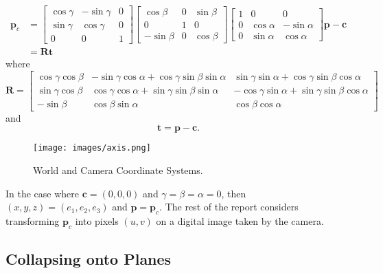 \documentclass[12pt]{article}
\newcommand{\mtx}[1]{\ensuremath{\mathbf{#1}}}
\begin{document}
\begin{align}
\textbf{p}_c & = 
\begin{bmatrix}
    \cos\gamma & -\sin\gamma & 0 \\
    \sin\gamma & \cos\gamma & 0 \\
       0 & 0 & 1
\end{bmatrix}
\begin{bmatrix}
    \cos\beta & 0 & \sin\beta \\
    0 & 1 & 0 \\
   -\sin\beta & 0 & \cos\beta
\end{bmatrix}
\begin{bmatrix}
    1 & 0 & 0 \\
    0 & \cos\alpha & -\sin\alpha \\
    0 & \sin\alpha &  \cos\alpha
\end{bmatrix}
\textbf{p}-\textbf{c}
\\ & =
\mtx{R} \mtx{t}
\end{align}
where
\begin{equation}
\mtx{R} =
\begin{bmatrix}
\cos\gamma\cos\beta & -\sin\gamma\cos\alpha + \cos\gamma\sin\beta\sin\alpha & \sin\gamma\sin\alpha + \cos\gamma\sin\beta\cos\alpha \\
\sin\gamma\cos\beta & \cos\gamma\cos\alpha + \sin\gamma\sin\beta\sin\alpha & -\cos\gamma\sin\alpha + \sin\gamma\sin\beta\cos\alpha \\
-\sin\beta & \cos\beta\sin\alpha & \cos\beta\cos\alpha
\end{bmatrix}
\end{equation}
and
\begin{equation}
\mtx{t} = \textbf{p}-\textbf{c}.
\end{equation}

\begin{figure}
\centering
\texttt{[image: images/axis.png]}
\caption{World and Camera Coordinate Systems.}\label{fig:axis}
\end{figure}

In the case where $\textbf{c} = (0,0,0)$ and $\gamma = \beta = \alpha = 0$, then  $(x,y,z) = (e_1,e_2,e_3)$  and  $\textbf{p} =\textbf{p}_c$. The rest of the report considers transforming $\textbf{p}_c$ into pixels $(u,v)$ on a digital image taken by the camera.

\subsection{Collapsing onto Planes}
\end{document}

